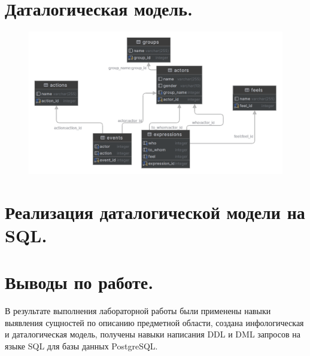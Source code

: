 \section{Даталогическая модель.}
\begin{figure}[H]
	\centering
	\includegraphics[scale=0.25]{img/data_model}
\end{figure}

\newpage

\section{Реализация даталогической модели на SQL.}
\tiny


\normalsize

\newpage

\section{Выводы по работе.}
В результате выполнения лабораторной работы были применены навыки выявления
сущностей по описанию предметной области, создана инфологическая и даталогическая
модель, получены навыки написания DDL и DML запросов на языке SQL для базы данных
PostgreSQL.